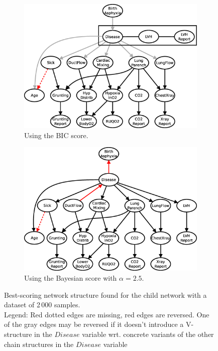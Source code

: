 \documentclass[english,cover]{fitthesis} %
\begin{document}
\begin{figure}[ht]
    \centering
    \begin{subfigure}[b]{0.45\linewidth}
        \hspace{-2.5cm}
        \includegraphics[scale=0.37]{fig/structure-learning-child-2000-bic}
        \caption{Using the BIC score.}
        \label{fig:structure-learning-child-2000-bic}
    \end{subfigure}
    \begin{subfigure}[b]{0.45\linewidth}
        \hspace{-0.7cm}
        \includegraphics[scale=0.37]{fig/structure-learning-child-2000-bayes-2_5}
        \caption{Using the Bayesian score with $\alpha = 2.5$.}
        \label{fig:structure-learning-child-2000-bayes-2_5}
    \end{subfigure}
    \caption{Best-scoring network structure found for the child network with a dataset of 2\,000 samples.
    \\Legend: Red dotted edges are missing, red edges are reversed. One of the gray edges may be reversed if it doesn't introduce a V-structure in the $Disease$ variable wrt. concrete variants of the other chain structures in the $Disease$ variable}
\end{figure}
\end{document}

